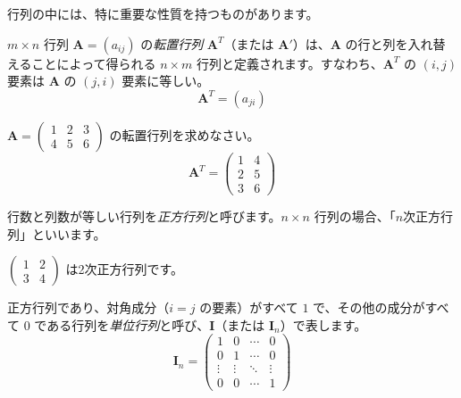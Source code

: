 行列の中には、特に重要な性質を持つものがあります。

\begin{dfn}[転置行列]
$m \times n$ 行列 $\bm{A} = (a_{ij})$ の\emph{転置行列} $\bm{A}^T$（または $\bm{A}'$）は、$\bm{A}$ の行と列を入れ替えることによって得られる $n \times m$ 行列と定義されます。すなわち、$\bm{A}^T$ の $(i,j)$ 要素は $\bm{A}$ の $(j,i)$ 要素に等しい。
\[ \bm{A}^T = (a_{ji}) \]
\end{dfn}

\begin{ex}
$\bm{A} = \begin{pmatrix} 1 & 2 & 3 \\ 4 & 5 & 6 \end{pmatrix}$ の転置行列を求めなさい。
\[ \bm{A}^T = \begin{pmatrix} 1 & 4 \\ 2 & 5 \\ 3 & 6 \end{pmatrix} \]
\end{ex}

\begin{dfn}[正方行列] \label{square_matrix}
行数と列数が等しい行列を\emph{正方行列}と呼びます。$n \times n$ 行列の場合、「$n$次正方行列」といいます。
\end{dfn}

\begin{ex}
$\begin{pmatrix} 1 & 2 \\ 3 & 4 \end{pmatrix}$ は2次正方行列です。
\end{ex}

\begin{dfn}[単位行列] \label{identity_matrix}
正方行列であり、対角成分（$i=j$ の要素）がすべて $1$ で、その他の成分がすべて $0$ である行列を\emph{単位行列}と呼び、$\bm{I}$（または $\bm{I}_n$）で表します。
\[\bm{I}_n = \begin{pmatrix}
1 & 0 & \cdots & 0 \\
0 & 1 & \cdots & 0 \\
\vdots & \vdots & \ddots & \vdots \\
0 & 0 & \cdots & 1
\end{pmatrix}\]
\end{dfn}


